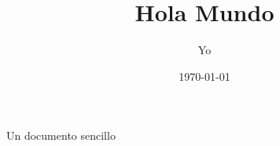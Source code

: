 \documentclass[12pt]{article}
\title{Hola Mundo}
\author{Yo}
\date{\today}
\begin{document}
\maketitle

Un documento sencillo
\end{document}
